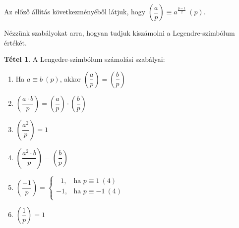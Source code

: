 \documentclass[12pt]{book}
\theoremstyle{plain} %
\theoremstyle{definition} %
\newtheorem{theo/}{Tétel}[section]
\newenvironment{theo}
  {\renewcommand{\qedsymbol}{$\clubsuit$}%
   \pushQED{\qed}\begin{theo/}}
  {\popQED\end{theo/}}
\theoremstyle{remark}
\renewcommand\qedsymbol{$\blacksquare$}
\numberwithin{equation}{section}  %
\begin{document}
	Az előző állítás következményéből látjuk, hogy $\left(\dfrac{a}{p}\right) \equiv a^{\frac{p-1}{2}}\ (p) $.
	
	Nézzünk szabályokat arra, hogyan tudjuk kiszámolni a Legendre-szimbólum értékét.
	
	\begin{theo}
		A Lengedre-szimbólum számolási szabályai:
		\begin{enumerate}
			\item{Ha $a\equiv b\ (p)$, akkor $\left(\dfrac{a}{p}\right)=\left(\dfrac{b}{p}\right)$}
			\item{$\left(\dfrac{a\cdot b}{p}\right) = \left(\dfrac{a}{p}\right) \cdot \left(\dfrac{b}{p}\right)$}
			\item{$\left(\dfrac{a^2}{p}\right)=1$}
			\item{$\left(\dfrac{a^2\cdot b}{p}\right)=\left(\dfrac{b}{p}\right)$}
			\item{$\left(\dfrac{-1}{p}\right)= \begin{cases}
				\ \ \ 1, & \text{ha $p\equiv 1\ (4)$ } \\
				-1, & \text{ha $p\equiv -1\ (4)$} \\
				\end{cases}$}
			\item{$\left(\dfrac{1}{p}\right) = 1$}
		\end{enumerate}
	\end{theo}
\end{document}
